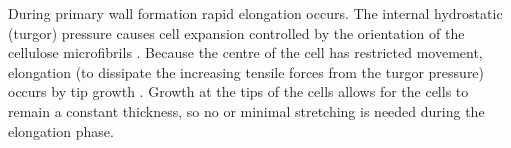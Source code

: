 During primary wall formation rapid elongation occurs. The internal hydrostatic (turgor) pressure causes cell expansion controlled by the orientation of the cellulose microfibrils \cite{Tyerman_2002} \cite{16261190}.
Because the centre of the cell has restricted movement, elongation
(to dissipate the increasing tensile forces from the turgor pressure)
occurs by
tip growth \cite{taiz2006plant}. Growth at the tips of the cells allows for the cells to
remain a constant thickness, so no or minimal stretching is needed during the elongation
phase.